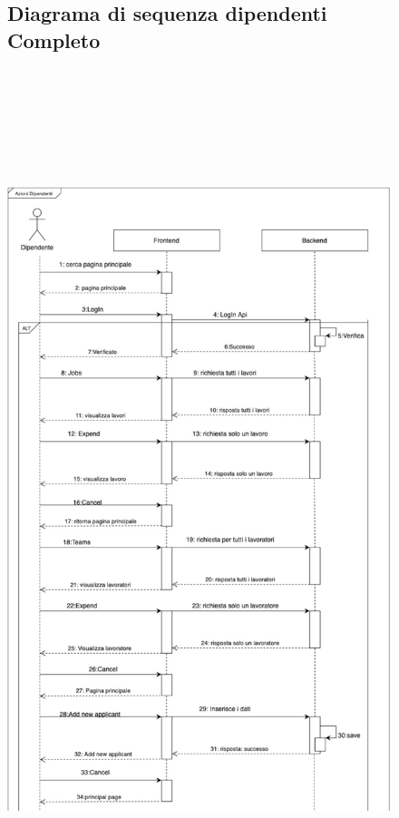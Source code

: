 \documentclass[ 4paper,11pt,openany]{book}
\begin{document}
\begin{figure}[htpb!] 
\subsection{Diagrama di sequenza dipendenti Completo}
	\includegraphics[height=250mm,width=180mm]{Seq_Dipendenti_Completo1.jpeg}
\end{figure}
\end{document}
